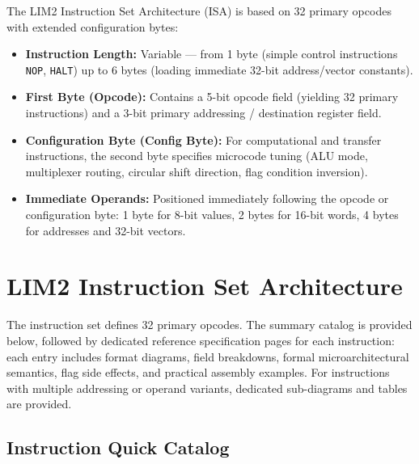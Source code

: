 \documentclass[11pt,a4paper]{article}
\begin{document}
The LIM2 Instruction Set Architecture (ISA) is based on 32 primary opcodes with extended configuration bytes:

\begin{archcallout}[title={Machine Instruction Encoding Format}]
\begin{itemize}
    \item \textbf{Instruction Length:} Variable — from 1 byte (simple control instructions \texttt{NOP}, \texttt{HALT}) up to 6 bytes (loading immediate 32-bit address/vector constants).
    \item \textbf{First Byte (Opcode):} Contains a 5-bit opcode field (yielding 32 primary instructions) and a 3-bit primary addressing / destination register field.
    \item \textbf{Configuration Byte (Config Byte):} For computational and transfer instructions, the second byte specifies microcode tuning (ALU mode, multiplexer routing, circular shift direction, flag condition inversion).
    \item \textbf{Immediate Operands:} Positioned immediately following the opcode or configuration byte: 1 byte for 8-bit values, 2 bytes for 16-bit words, 4 bytes for addresses and 32-bit vectors.
\end{itemize}
\end{archcallout}


\section{LIM2 Instruction Set Architecture}

The instruction set defines 32 primary opcodes. The summary catalog is provided below, followed by dedicated reference specification pages for each instruction: each entry includes format diagrams, field breakdowns, formal microarchitectural semantics, flag side effects, and practical assembly examples. For instructions with multiple addressing or operand variants, dedicated sub-diagrams and tables are provided.

\subsection{Instruction Quick Catalog}
\end{document}
